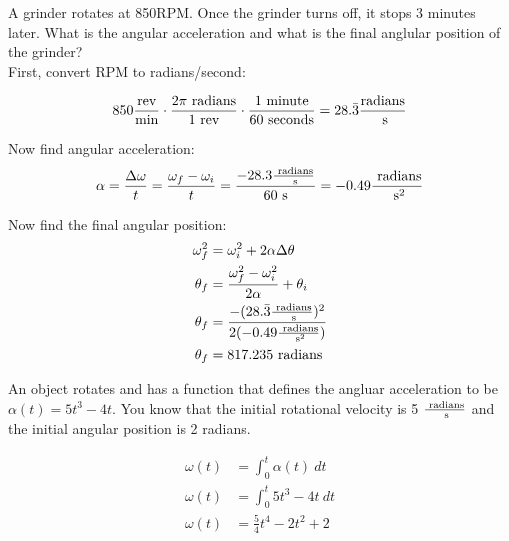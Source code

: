 \begin{problem}
    A grinder rotates at 850RPM. Once the grinder turns off, it stops 3 minutes later. What is the angular acceleration and what is the final anglular position of the grinder?\\

    First, convert RPM to radians/second:

    \[
    850 \frac{\text{rev}}{\text{min}}\cdot\frac{2\pi \text{ radians}}{1 \text{ rev}}\cdot\frac{1 \text{ minute}}{60 \text{ seconds}} = 28.\bar{3} \frac{\text{radians}}{\text{ s}}   
    \]

    Now find angular acceleration:
    \[
    \alpha = \frac{\Delta \omega}{t} = \frac{\omega_f - \omega_i}{t} = \frac{- 28.3 \frac{\text{ radians}}{\text{ s}}}{60 \text{ s}} = -0.49 \frac{\text{ radians}}{\text{ s}^2}   
    \]

    Now find the final angular position:
    \[
    \begin{aligned}
        \omega_f^2 &= \omega_i^2 + 2\alpha\Delta\theta\\
        \theta_f &= \frac{\omega_f^2 - \omega_i^2}{2\alpha} + \theta_i\\
        \theta_f &= \frac{-(28.\bar{3} \frac{\text{ radians}}{\text{ s}})^2}{2(-0.49 \frac{\text{ radians}}{\text{ s}^2})}\\
        \theta_f &= 817.235 \text{ radians}
    \end{aligned}    
    \]
\end{problem}


\begin{problem}
    An object rotates and has a function that defines the angluar acceleration to be $\alpha(t) = 5t^3 - 4t$. You know that the initial rotational velocity is 5 $\frac{\text{ radians}}{\text{ s}}$ and the initial angular position is 2 radians. 

    \[
    \begin{aligned}
        \omega(t) &= \int_0^t \alpha(t)\:dt\\
        \omega(t) &= \int_0^t 5t^3 - 4t \: dt\\
        \omega(t) &= \frac{5}{4}t^4 - 2t^2 + 2
    \end{aligned}    
    \]
\end{problem}
